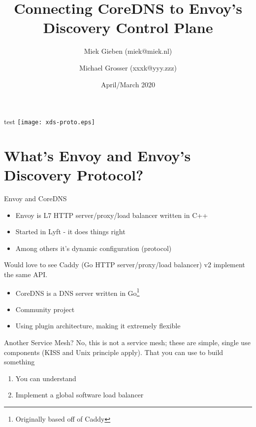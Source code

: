 \documentclass[aspectratio=169]{beamer}
\title{Connecting CoreDNS to Envoy's Discovery Control Plane}
\date{April/March 2020}
\author{Miek Gieben (miek@miek.nl) \and Michael Grosser (xxxk@yyy.zzz)}
\institute{Centre for protobuf Nerding}
\begin{document}
    \let\oldfootnotesize\footnotesize
    \renewcommand*{\footnotesize}{\oldfootnotesize\tiny}

    \maketitle

    \begin{frame}{test}
        \texttt{[image: xds-proto.eps]}
    \end{frame}

    \section{What's Envoy and Envoy's Discovery Protocol?}
    \begin{frame}{Envoy and CoreDNS}
        \begin{itemize}
            \item Envoy is L7 HTTP server/proxy/load balancer written in C++
            \item Started in Lyft - it does things right
            \item Among others it's dynamic configuration (protocol)
        \end{itemize}
        Would love to see Caddy (Go HTTP server/proxy/load balancer) v2 implement the same API.
        \begin{itemize}
            \item CoreDNS is a DNS server written in Go\footnote{Originally based off of Caddy}
            \item Community project
            \item Using plugin architecture, making it extremely flexible
        \end{itemize}
    \end{frame}

    \begin{frame}{Another Service Mesh?}
        No, this is not a service mesh; these are simple, single use components (KISS and Unix principle apply). That you can use
        to build something
        \begin{enumerate}
            \item You can understand
            \item Implement a global software load balancer
        \end{enumerate}
    \end{frame}
\end{document}
